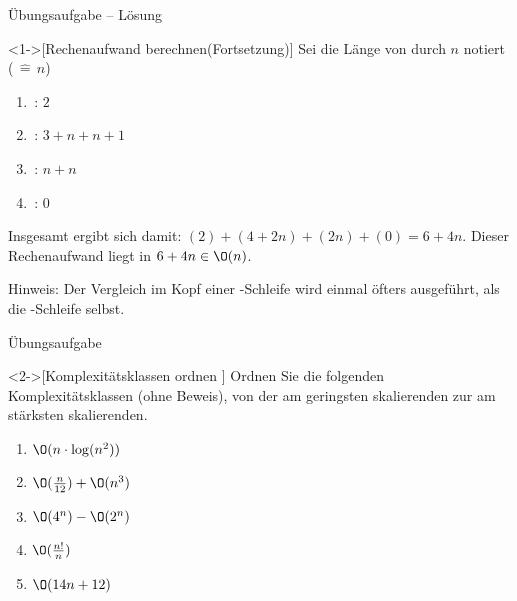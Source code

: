 \begin{frame}[c]{Übungsaufgabe -- Lösung}
    \addtocounter{solve}{-1}%
    \begin{solve}<1->[Rechenaufwand berechnen\hfill{}(Fortsetzung)]
        \pause{}Sei die Länge von  durch \(n\) notiert (\(\,\widehat{=}\, n\))
\begin{multicols}{2}
    \begin{enumerate}[<+(1)->]
        \item {}\,: \(2\)
        \item {}\,: \(3 + n + n + 1\)
        \item {}\,: \(n+n\)
        \item {}\,: \(0\)
    \end{enumerate}
\end{multicols}
    \pause{}Insgesamt ergibt sich damit: \((2) + (4 + 2n) + (2n) + (0) = 6 + 4n\).\pause{} Dieser Rechenaufwand liegt in \(6 + 4n \in \O(n)\).\smallskip\par\pause{}Hinweis: Der Vergleich im Kopf einer -Schleife wird einmal öfters ausgeführt,\pause{} als die -Schleife selbst.
    \end{solve}
\end{frame}

\begin{frame}[fragile,c]{Übungsaufgabe}
    \begin{exercise}<2->[Komplexitätsklassen ordnen ]
        \pause{}Ordnen Sie die folgenden Komplexitätsklassen (ohne Beweis), von der am geringsten skalierenden zur am stärksten skalierenden.\pause{}
        \begin{multicols}{3}
            \begin{enumerate}[<+(1)->]\widei
                \item \(\O(n \cdot \log(n^2))\)
                \item \(\O(\frac{n}{12}) + \O(n^3)\)
                \item \(\O(4^n)-\O(2^n)\)
                \item \(\O(\frac{n!}{n})\)
                \item \(\O(14n+12)\)
            \end{enumerate}
        \end{multicols}
    \end{exercise}
\end{frame}

